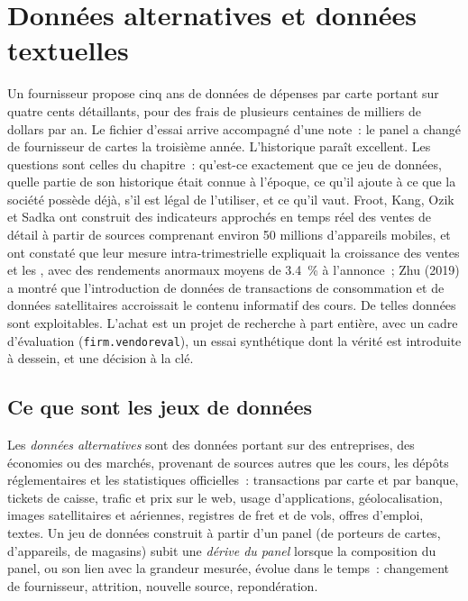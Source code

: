 \chapter{Données alternatives et données textuelles}\label{ch:rs:alternative-and-text-data}

Un fournisseur propose cinq ans de données de dépenses par carte portant sur quatre cents détaillants, pour des frais de plusieurs centaines de milliers de dollars par
an. Le fichier d'essai arrive accompagné d'une note~: le panel a changé de fournisseur de cartes la troisième année. L'historique paraît excellent. Les
questions sont celles du chapitre~: qu'est-ce exactement que ce jeu de données, quelle partie de son historique était connue à l'époque, ce qu'il ajoute à
ce que la société possède déjà, s'il est légal de l'utiliser, et ce qu'il vaut. Froot, Kang, Ozik et Sadka ont construit des indicateurs approchés en temps réel des
ventes de détail à partir de sources comprenant environ 50 millions d'appareils mobiles, et ont constaté que leur mesure intra-trimestrielle expliquait
la croissance des ventes et les , avec des rendements anormaux moyens de 3.4~\% à l'annonce~; Zhu (2019) a montré que
l'introduction de données de transactions de consommation et de données satellitaires accroissait le contenu informatif des cours. De telles données sont exploitables. L'achat est
un projet de recherche à part entière, avec un cadre d'évaluation (\texttt{firm.vendoreval}), un essai synthétique dont la vérité est introduite à dessein, et une décision
à la clé.

\section{Ce que sont les jeux de données}

\begin{definition}\label{def:rs:alternative-and-text-data:altdata}
Les \emph{données alternatives} sont des données portant sur des entreprises, des économies ou des marchés, provenant de sources autres que les cours, les dépôts réglementaires et les statistiques officielles~:
transactions par carte et par banque, tickets de caisse, trafic et prix sur le web, usage d'applications, géolocalisation, images satellitaires
et aériennes, registres de fret et de vols, offres d'emploi, textes. Un jeu de données construit à partir d'un panel (de porteurs de cartes, d'appareils, de magasins) subit une
\emph{dérive du panel} lorsque la composition du panel, ou son lien avec la grandeur mesurée, évolue dans le temps~:
changement de fournisseur, attrition, nouvelle source, repondération.
\end{definition}


